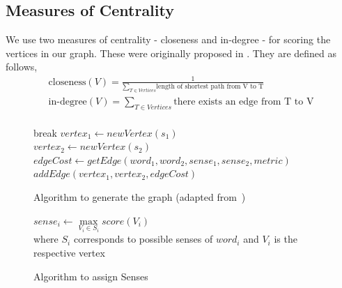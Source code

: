 \documentclass[12pt,letterpaper]{article}
\begin{document}
\subsection{Measures of Centrality}
We use two measures of centrality - closeness and in-degree - for scoring the vertices in our graph. These were originally proposed in \cite{Sinha}. They are defined as follows, \\
\begin{align*} 
\text{closeness}(V)= \frac{1}{\sum\limits_{T \in Vertices}{\text{length of shortest path from V to T}}} \\
\text{in-degree}(V)= \sum\limits_{T \in Vertices} \text{there exists an edge from T to V} \\
\end{align*} 
\begin{figure}
\begin{algorithm}[H]
{
	{
		{
			break
		}
		\Else
		{
			{
				{
					$vertex_1 \gets newVertex(s_1)$ \\
					$vertex_2 \gets newVertex(s_2)$ \\
					$edgeCost \gets getEdge(word_1,word_2,sense_1,sense_2,metric)$ 
					$addEdge(vertex_1,vertex_2,edgeCost)$
				}	
			}
		}
	}
}
\caption{Algorithm to generate the graph (adapted from~\cite{Sinha})}
\end{algorithm}
\begin{algorithm}[H]
{
	$sense_i\gets \max\limits_{V_i \in S_i} score(V_i)$ \\
	where $S_i$ corresponds to possible senses of $word_i$ and $V_i$ is the respective vertex
}
\caption{Algorithm to assign Senses}
\end{algorithm}
\end{figure}
\end{document}
